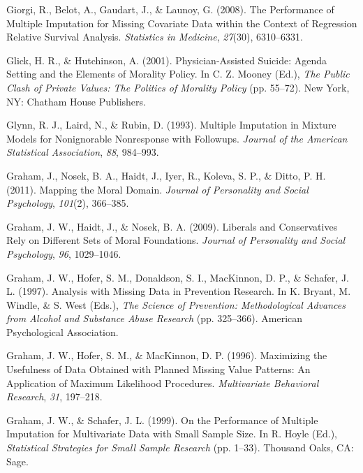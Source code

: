 \documentclass[12pt,econ]{sources/authesis}
\begin{document}
\leavevmode\hypertarget{ref-giorgi_2008_performance}{}%
Giorgi, R., Belot, A., Gaudart, J., \& Launoy, G. (2008). The Performance of Multiple Imputation for Missing Covariate Data within the Context of Regression Relative Survival Analysis. \emph{Statistics in Medicine}, \emph{27}(30), 6310--6331.

\leavevmode\hypertarget{ref-glick_2001_physician-assisted}{}%
Glick, H. R., \& Hutchinson, A. (2001). Physician-Assisted Suicide: Agenda Setting and the Elements of Morality Policy. In C. Z. Mooney (Ed.), \emph{The Public Clash of Private Values: The Politics of Morality Policy} (pp. 55--72). New York, NY: Chatham House Publishers.

\leavevmode\hypertarget{ref-glynn_1993_multiple}{}%
Glynn, R. J., Laird, N., \& Rubin, D. (1993). Multiple Imputation in Mixture Models for Nonignorable Nonresponse with Followups. \emph{Journal of the American Statistical Association}, \emph{88}, 984--993.

\leavevmode\hypertarget{ref-graham_2011_mapping}{}%
Graham, J., Nosek, B. A., Haidt, J., Iyer, R., Koleva, S. P., \& Ditto, P. H. (2011). Mapping the Moral Domain. \emph{Journal of Personality and Social Psychology}, \emph{101}(2), 366--385.

\leavevmode\hypertarget{ref-graham_2009_liberals}{}%
Graham, J. W., Haidt, J., \& Nosek, B. A. (2009). Liberals and Conservatives Rely on Different Sets of Moral Foundations. \emph{Journal of Personality and Social Psychology}, \emph{96}, 1029--1046.

\leavevmode\hypertarget{ref-graham_1997_analysis}{}%
Graham, J. W., Hofer, S. M., Donaldson, S. I., MacKinnon, D. P., \& Schafer, J. L. (1997). Analysis with Missing Data in Prevention Research. In K. Bryant, M. Windle, \& S. West (Eds.), \emph{The Science of Prevention: Methodological Advances from Alcohol and Substance Abuse Research} (pp. 325--366). American Psychological Association.

\leavevmode\hypertarget{ref-graham_1996_maximizing}{}%
Graham, J. W., Hofer, S. M., \& MacKinnon, D. P. (1996). Maximizing the Usefulness of Data Obtained with Planned Missing Value Patterns: An Application of Maximum Likelihood Procedures. \emph{Multivariate Behavioral Research}, \emph{31}, 197--218.

\leavevmode\hypertarget{ref-graham_1999_performance}{}%
Graham, J. W., \& Schafer, J. L. (1999). On the Performance of Multiple Imputation for Multivariate Data with Small Sample Size. In R. Hoyle (Ed.), \emph{Statistical Strategies for Small Sample Research} (pp. 1--33). Thousand Oaks, CA: Sage.
\end{document}
